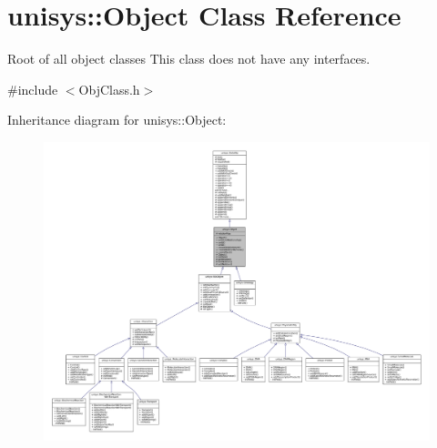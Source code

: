 \hypertarget{classunisys_1_1Object}{\section{unisys\-:\-:Object Class Reference}
\label{classunisys_1_1Object}
}


Root of all object classes This class does not have any interfaces.  




{\ttfamily \#include $<$Obj\-Class.\-h$>$}



Inheritance diagram for unisys\-:\-:Object\-:
\nopagebreak
\begin{figure}[H]
\begin{center}
\leavevmode
\includegraphics[width=350pt]{classunisys_1_1Object__inherit__graph}
\end{center}
\end{figure}


